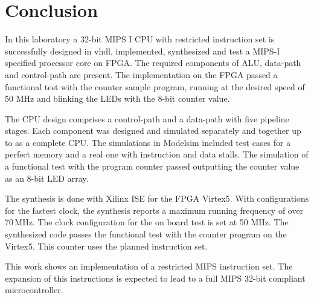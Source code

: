 \chapter{Conclusion}
In this laboratory a 32-bit MIPS I CPU with restricted instruction set is successfully designed in vhdl, implemented, synthesized and test a MIPS-I specified processor core on FPGA. 
The required components of ALU, data-path and control-path are present.
The implementation on the FPGA passed a functional test with the counter sample program, running at the desired speed of 50 MHz and blinking the LEDs with the 8-bit counter value.

The CPU design comprises a control-path and a data-path with five pipeline stages.  Each component was designed and simulated separately and
together up to as a complete CPU. The simulations in Modelsim included test cases for a perfect memory and a real one with instruction and data stalls.
The simulation of a functional test with the program counter passed outputting the counter value as an 8-bit LED array.

The synthesis is done with Xilinx ISE for the FPGA Virtex5. With configurations for the fastest clock, the synthesis reports a maximum running
frequency of over 70\,MHz. The clock configuration for the on board test is set at 50 MHz. The synthesized code passes the functional test with
the counter program on the Virtex5. This counter uses the planned instruction set.

This work shows an implementation of a restricted MIPS instruction set. The expansion of this instructions is expected to lead to a full MIPS 32-bit compliant microcontroller.